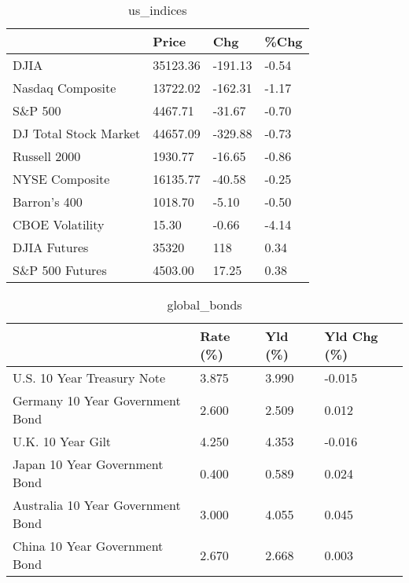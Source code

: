 \documentclass{article}%
\begin{document}
%


\begin{table}[htbp]%
\caption{us\_indices}%
\centering%
\begin{adjustbox}{width=1\textwidth}%
\begin{tabular}{llll}
\toprule
                      &    Price &     Chg &  \%Chg \\
\midrule
                 DJIA & 35123.36 & -191.13 & -0.54 \\
     Nasdaq Composite & 13722.02 & -162.31 & -1.17 \\
              S\&P 500 &  4467.71 &  -31.67 & -0.70 \\
DJ Total Stock Market & 44657.09 & -329.88 & -0.73 \\
         Russell 2000 &  1930.77 &  -16.65 & -0.86 \\
       NYSE Composite & 16135.77 &  -40.58 & -0.25 \\
         Barron's 400 &  1018.70 &   -5.10 & -0.50 \\
      CBOE Volatility &    15.30 &   -0.66 & -4.14 \\
         DJIA Futures &    35320 &     118 &  0.34 \\
      S\&P 500 Futures &  4503.00 &   17.25 &  0.38 \\
\bottomrule
\end{tabular}
%
\end{adjustbox}%
\end{table}

%


\begin{table}[htbp]%
\caption{global\_bonds}%
\centering%
\begin{adjustbox}{width=1\textwidth}%
\begin{tabular}{llll}
\toprule
                                  & Rate (\%) & Yld (\%) & Yld Chg (\%) \\
\midrule
       U.S. 10 Year Treasury Note &    3.875 &   3.990 &      -0.015 \\
  Germany 10 Year Government Bond &    2.600 &   2.509 &       0.012 \\
                U.K. 10 Year Gilt &    4.250 &   4.353 &      -0.016 \\
    Japan 10 Year Government Bond &    0.400 &   0.589 &       0.024 \\
Australia 10 Year Government Bond &    3.000 &   4.055 &       0.045 \\
    China 10 Year Government Bond &    2.670 &   2.668 &       0.003 \\
\bottomrule
\end{tabular}
%
\end{adjustbox}%
\end{table}
\end{document}
